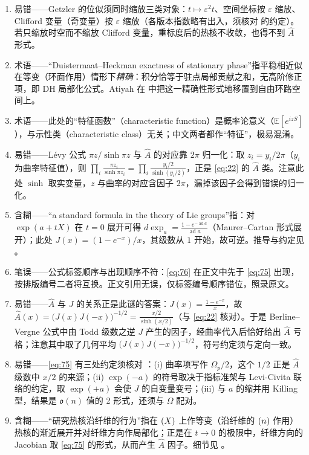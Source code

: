 \documentclass[11pt]{amsart}
\theoremstyle{definition}
\theoremstyle{remark}
\theoremstyle{plain}
\numberwithin{equation}{section}
\renewcommand{\:}{\colon}
\newcommand{\Ahat}{{\hat A}}
\let\O\relax
\DeclareMathOperator{\O}{O}
\let\O\relax\DeclareMathOperator{\O}{O}
\DeclareMathOperator{\ad}{ad}
\begin{document}
\begin{enumerate}[leftmargin=2.2em,itemsep=2pt,topsep=2pt]
  \item 易错——Getzler 的位似须同时缩放三类对象：$t\mapsto\varepsilon^2 t$、空间坐标按 $\varepsilon$ 缩放、Clifford 变量（奇变量）按 $\varepsilon$ 缩放（各版本指数略有出入，须核对 \cite{Ge2} 的约定）。若只缩放时空而不缩放 Clifford 变量，重标度后的热核不收敛，也得不到 $\Ahat$ 形式。
  \item 术语——“Duistermaat–Heckman exactness of stationary phase”指平稳相近似在等变（环面作用）情形下\emph{精确}：积分恰等于驻点局部贡献之和，无高阶修正项，即 DH 局部化公式。Atiyah 在 \cite{A6} 中把这一精确性形式地移置到自由环路空间上。
  \item 术语——此处的“特征函数”（characteristic function）是概率论意义（$\mathbb{E}[e^{izS}]$），与示性类（characteristic class）无关；中文两者都作“特征”，极易混淆。
  \item 易错——Lévy 公式 $\pi z/\sinh\pi z$ 与 $\Ahat$ 的对应靠 $2\pi$ 归一化：取 $z_i=y_i/2\pi$（$y_i$ 为曲率特征值），则 $\prod_i\frac{\pi z_i}{\sinh \pi z_i}=\prod_i\frac{y_i/2}{\sinh(y_i/2)}$，正是 \eqref{eq:22} 的 $\Ahat$ 类。注意此处 $\sinh$ 取实变量，$z$ 与曲率的对应含因子 $2\pi$，漏掉该因子会得到错误的归一化。
  \item 含糊——“a standard formula in the theory of Lie groups”指：对 $\exp(a+tX)$ 在 $t=0$ 展开可得 $d\exp_a=\frac{1-e^{-\ad a}}{\ad a}$（Maurer–Cartan 形式展开）；此处 $J(x)=(1-e^{-x})/x$，其级数从 $1$ 开始，故可逆。推导与约定见 \cite{BV}。
  \item 笔误——公式标签顺序与出现顺序不符：\eqref{eq:76} 在正文中先于 \eqref{eq:75} 出现，按排版编号二者将互换。正文引用无误，仅标签编号顺序错位，照录原文。
  \item 易错——$\Ahat$ 与 $J$ 的关系正是此谜的答案：$J(x)=\frac{1-e^{-x}}{x}$，故 $\Ahat(x)=\bigl(J(x)J(-x)\bigr)^{-1/2}=\frac{x/2}{\sinh(x/2)}$（与 \eqref{eq:22} 核对）。于是 Berline–Vergne 公式中由 Todd 级数之逆 $J$ 产生的因子，经曲率代入后恰好给出 $\Ahat$ 亏格；注意其中取了几何平均 $\bigl(J(x)J(-x)\bigr)^{-1/2}$，符号约定须与定向一致。
  \item 易错——\eqref{eq:75} 有三处约定须核对 \cite{BV}：(i) 曲率项写作 $\Omega_p/2$，这个 $1/2$ 正是 $\Ahat$ 级数中 $x/2$ 的来源；(ii) $\exp(-a)$ 的符号取决于指标准架与 Levi-Civita 联络的约定，取 $\exp(+a)$ 会使 $J$ 的自变量变号；(iii) 与 $a$ 的缩并用 Killing 型，结果是 $\mathfrak{o}(n)$ 值的 2 形式，还须与 $\Omega$ 配对。
  \item 含糊——“研究热核沿纤维的行为”指在 $\O(X)$ 上作等变（沿纤维的 $\O(n)$ 作用）热核的渐近展开并对纤维方向作局部化；正是在 $t\to0$ 的极限中，纤维方向的 Jacobian 取 \eqref{eq:75} 的形式，从而产生 $\Ahat$ 因子。细节见 \cite{BV}。
\end{enumerate}
\end{document}
